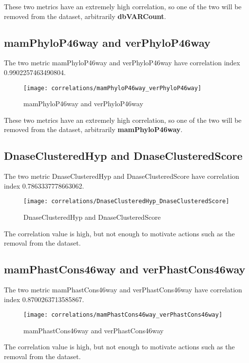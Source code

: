 \documentclass[\main/main.tex]{subfiles}
\begin{document}
These two metrics have an extremely high correlation, so one of the two will be removed from the dataset, arbitrarily \textbf{dbVARCount}.

\subsection{mamPhyloP46way and verPhyloP46way}
The two metric mamPhyloP46way and verPhyloP46way have correlation index 0.9902257463490804.

\begin{figure}
  \texttt{[image: correlations/mamPhyloP46way\_verPhyloP46way]}
  \caption{mamPhyloP46way and verPhyloP46way}
\end{figure}

These two metrics have an extremely high correlation, so one of the two will be removed from the dataset, arbitrarily \textbf{mamPhyloP46way}.

\subsection{DnaseClusteredHyp and DnaseClusteredScore}
The two metric DnaseClusteredHyp and DnaseClusteredScore have correlation index 0.7863337778663062.

\begin{figure}
  \texttt{[image: correlations/DnaseClusteredHyp\_DnaseClusteredScore]}
  \caption{DnaseClusteredHyp and DnaseClusteredScore}
\end{figure}

The correlation value is high, but not enough to motivate actions such as the removal from the dataset.

\subsection{mamPhastCons46way and verPhastCons46way}
The two metric mamPhastCons46way and verPhastCons46way have correlation index 0.8700263713585867.

\begin{figure}
  \texttt{[image: correlations/mamPhastCons46way\_verPhastCons46way]}
  \caption{mamPhastCons46way and verPhastCons46way}
\end{figure}

The correlation value is high, but not enough to motivate actions such as the removal from the dataset.
\end{document}
